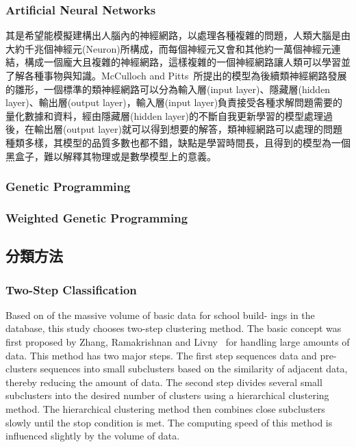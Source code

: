 \subsubsection{Artificial Neural Networks}

其是希望能模擬建構出人腦內的神經網路，以處理各種複雜的問題，人類大腦是由大約千兆個神經元(Neuron)所構成，而每個神經元又會和其他約一萬個神經元連結，構成一個龐大且複雜的神經網路，這樣複雜的一個神經網路讓人類可以學習並了解各種事物與知識。McCulloch and Pitts~\cite{mcculloch1943logical}所提出的模型為後續類神經網路發展的雛形，一個標準的類神經網路可以分為輸入層(input layer)、隱藏層(hidden layer)、輸出層(output layer)，輸入層(input layer)負責接受各種求解問題需要的量化數據和資料，經由隱藏層(hidden layer)的不斷自我更新學習的模型處理過後，在輸出層(output layer)就可以得到想要的解答，類神經網路可以處理的問題種類多樣，其模型的品質多數也都不錯，缺點是學習時間長，且得到的模型為一個黑盒子，難以解釋其物理或是數學模型上的意義。

\subsubsection{Genetic Programming}



\subsubsection{Weighted Genetic Programming}


\subsection{分類方法}

\subsubsection{Two-Step Classification}

Based on of the massive volume of basic data for school build- ings in the database, this study chooses two-step clustering method. The basic concept was first proposed by Zhang, Ramakrishnan and Livny~\cite{zhang1996birch} for handling large amounts of data. This method has two major steps. The first step sequences data and pre-clusters sequences into small subclusters based on the similarity of adjacent data, thereby reducing the amount of data. The second step divides several small subclusters into the desired number of clusters using a hierarchical clustering method. The hierarchical clustering method then combines close subclusters slowly until the stop condition is met. The computing speed of this method is influenced slightly by the volume of data.


